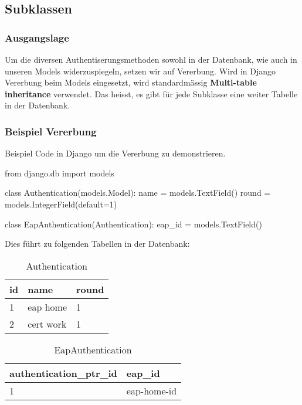 \subsection{Subklassen}
\label{subklassen}
\subsubsection{Ausgangslage}
Um die diversen Authentiserungsmethoden sowohl in der Datenbank, wie auch in unseren Models widerzuspiegeln, setzen wir auf Vererbung. Wird in Django Vererbung beim Models eingesetzt, wird standardmässig \textbf{Multi-table inheritance} verwendet. Das heisst, es gibt für jede Subklasse eine weiter Tabelle in der Datenbank.

\subsubsection{Beispiel Vererbung}
Beispiel Code in Django um die Vererbung zu demonstrieren.
\medskip
\begin{python}
from django.db import models

class Authentication(models.Model):
    name = models.TextField()
    round = models.IntegerField(default=1)

class EapAuthentication(Authentication):
    eap_id = models.TextField()
\end{python}

\medskip
Dies führt zu folgenden Tabellen in der Datenbank:\\

\begin{table}[H]
	\centering
    \begin{tabular}{|p{3cm}|p{3cm}|p{3cm}|}
    \hline    
    \rowcolor{lightblue}
	id & name & round \\ \hline   
	1 & eap home & 1 \\ \hline
	2 & cert work & 1 \\ \hline
    \end{tabular}
    \caption[Authentication]{Authentication}
\end{table}
\vspace*{1 cm}
\begin{table}[H]
	\centering
    \begin{tabular}{|p{4.5cm}|p{4.5cm}|}
    \hline    
    \rowcolor{lightblue}
	authentication\_ptr\_id & eap\_id \\ \hline   
	1 & eap-home-id  \\ \hline
    \end{tabular}
    \caption[EapAuthentication]{EapAuthentication}
\end{table}
\medskip

